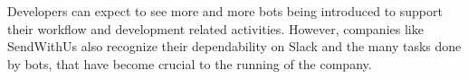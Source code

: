 \documentclass{sig-alternate}
\newcommand{\cl}[1]{\textcolor{blue}{{\it [Carly says: #1]}}}
\newcommand{\cp}[1]{\textcolor{red}{{\it [Cassie says: #1]}}}
\begin{document}
\begin{mdframed}
Developers can expect to see more and more bots being introduced to support their workflow and development related activities. However, companies like SendWithUs also recognize their dependability on Slack and the many tasks done by bots, that have become crucial to the running of the company.

\end{mdframed}


 
\end{document}
